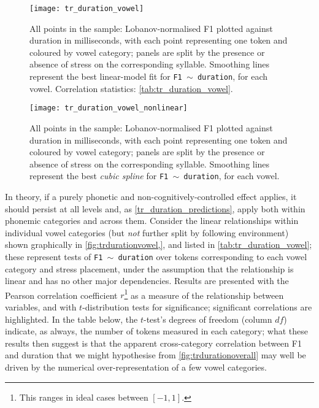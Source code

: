 \begin{figure}[ht]
  \centering
  \texttt{[image: tr\_duration\_vowel]}
  \caption[Duration plotted against F1, linear fit by vowel category.]{All points in the sample: Lobanov-normalised F1 plotted against duration in milliseconds, with each point representing one token and coloured by vowel category; panels are split by the presence or absence of stress on the corresponding syllable. Smoothing lines represent the best linear-model fit for \texttt{F1 $\sim$ duration}, for each vowel. Correlation statistics: \cref{tab:tr_duration_vowel}.}
  \label{fig:trdurationvowel}
\end{figure}

\begin{figure}[ht]
  \centering
  \texttt{[image: tr\_duration\_vowel\_nonlinear]}
  \caption[Duration plotted against F1, cubic spline fit by vowel category.]{All points in the sample: Lobanov-normalised F1 plotted against duration in milliseconds, with each point representing one token and coloured by vowel category; panels are split by the presence or absence of stress on the corresponding syllable. Smoothing lines represent the best \textit{cubic spline} for \texttt{F1 $\sim$ duration}, for each vowel.}
  \label{fig:trdurationvowel_nonlinear}
\end{figure}

In theory, if a purely phonetic and non-cognitively-controlled effect applies, it should persist at all levels and, as \cref{tr_duration_predictions}, apply both within phonemic categories and across them. Consider the linear relationships within individual vowel categories (but \emph{not} further split by following environment) shown graphically in \cref{fig:trdurationvowel,}, and listed in \cref{tab:tr_duration_vowel}; these represent tests of \texttt{F1 $\sim$ duration} over tokens corresponding to each vowel category and stress placement, under the assumption that the relationship is linear and has no other major dependencies. Results are presented with the Pearson correlation coefficient $r$\footnote{This ranges in ideal cases between $[-1, 1]$.} as a measure of the relationship between variables, and with $t$-distribution tests for significance; significant correlations are highlighted. In the table below, the $t$-test's degrees of freedom (column $df$) indicate, as always, the number of tokens measured in each category; what these results then suggest is that the apparent cross-category correlation between F1 and duration that we might hypothesise from \cref{fig:trdurationoverall} may well be driven by the numerical over-representation of a few vowel categories.

